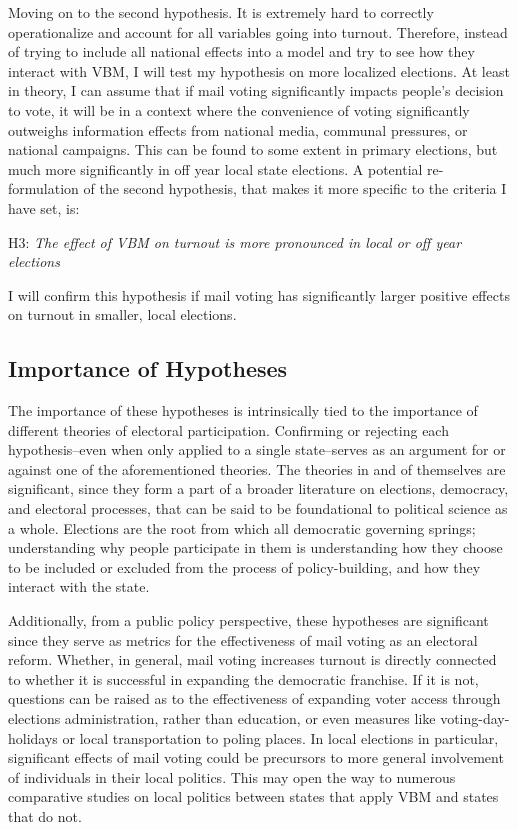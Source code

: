 \documentclass[12pt,twoside]{reedthesis}
\begin{document}
  Moving on to the second hypothesis. It is extremely hard to correctly
  operationalize and account for all variables going into turnout.
  Therefore, instead of trying to include all national effects into a
  model and try to see how they interact with VBM, I will test my
  hypothesis on more localized elections. At least in theory, I can assume
  that if mail voting significantly impacts people's decision to vote, it
  will be in a context where the convenience of voting significantly
  outweighs information effects from national media, communal pressures,
  or national campaigns. This can be found to some extent in primary
  elections, but much more significantly in off year local state
  elections. A potential re-formulation of the second hypothesis, that
  makes it more specific to the criteria I have set, is:
  
  \begin{center}    
  H3: \textit{The  effect  of  VBM  on  turnout  is  more  pronounced  in  local  or  off year elections}
  \end{center}
  
  I will confirm this hypothesis if mail voting has significantly larger
  positive effects on turnout in smaller, local elections.
  
  \subsection{Importance of Hypotheses}\label{importance-of-hypotheses}
  
  The importance of these hypotheses is intrinsically tied to the
  importance of different theories of electoral participation. Confirming
  or rejecting each hypothesis--even when only applied to a single
  state--serves as an argument for or against one of the aforementioned
  theories. The theories in and of themselves are significant, since they
  form a part of a broader literature on elections, democracy, and
  electoral processes, that can be said to be foundational to political
  science as a whole. Elections are the root from which all democratic
  governing springs; understanding why people participate in them is
  understanding how they choose to be included or excluded from the
  process of policy-building, and how they interact with the state.
  
  Additionally, from a public policy perspective, these hypotheses are
  significant since they serve as metrics for the effectiveness of mail
  voting as an electoral reform. Whether, in general, mail voting
  increases turnout is directly connected to whether it is successful in
  expanding the democratic franchise. If it is not, questions can be
  raised as to the effectiveness of expanding voter access through
  elections administration, rather than education, or even measures like
  voting-day-holidays or local transportation to poling places. In local
  elections in particular, significant effects of mail voting could be
  precursors to more general involvement of individuals in their local
  politics. This may open the way to numerous comparative studies on local
  politics between states that apply VBM and states that do not.
  
\end{document}
